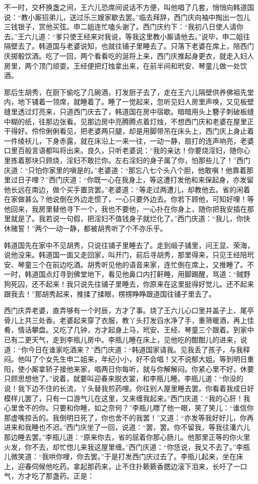 不一时，交杯换盏之间，王六儿恐席间说话不方便，叫他唱了几套，悄悄向韩道国说：“教小厮招弟儿，送过乐三嫂家歇去罢。”临去拜辞，西门庆向袖中掏出一包儿三钱银子，赏他买弦。申二姐连忙嗑头谢了。西门庆约下：“我初八日使人请你去。”王六儿道：“爹只使王经来对我说，等我这里教小厮请他去。”说毕，申二姐往隔壁去了。韩道国与老婆说知，也就往铺子里睡去了。只落下老婆在席上，陪西门庆掷骰饮酒。吃了一回，两个看看吃的涎将上来，西门庆推起身更衣，就走入妇人房里，两个顶门顽耍。王经便把灯烛拿出来，在前半间和玳安、琴童儿做一处饮酒。

那后生胡秀，在厨下偷吃了几碗酒，打发厨子去了，走在王六儿隔壁供养佛祖先堂内，地下铺着一领席，就睡着了。睡了一觉起来，忽听见妇人房里声唤，又见板壁缝里透过灯亮来，只道西门庆去了，韩道国在房中宿歇。暗暗用头上簪子刺破板缝中糊的纸，往那边张看。见那边房中亮腾腾点着灯烛，不想西门庆和老婆在屋里正干得好。伶伶俐俐看见，把老婆两只腿，却是用脚带吊在床头上，西门庆上身止着一件绫袄儿，下身赤露，就在床沿上一来一往，一动一静，扇打的连声响亮，老婆口里百般言语都叫将出来。良久，只听老婆说：“我的亲达！你要烧淫妇，随你心里拣着那块只顾烧，淫妇不敢拦你。左右淫妇的身子属了你，怕那些儿了！”西门庆道：“只怕你家里的嗔是的。”老婆道：“那忘八七个头八个胆，他敢嗔！他靠着那里过日子哩？”西门庆道：“你既一心在我身上，等这遭打发他和来保起身，亦发留他长远在南边，做个买手置货罢。”老婆道：“等走过两遭儿，却教他去。省的闲着在家做甚么？他说倒在外边走惯了，一心只要外边去。你若下顾他，可知好哩！等他回来，我房里替他寻下一个，我也不要他，一心扑在你身上，随你把我安插在那里就是了。我若说一句假，把淫妇不值钱身子就烂化了。”西门庆道：“我儿，你快休赌誓！”两个一动一静，都被胡秀听了个不亦乐乎。

韩道国先在家中不见胡秀，只说往铺子里睡去了。走到缎子铺里，问王显、荣海，说他没来。韩道国一面又走回家，叫开门，前后寻胡秀，那里得来，只见王经陪玳安、琴童三个在前边吃酒。胡秀听见他的语音来家，连忙倒在席上，又推睡了。不一时，韩道国点灯寻到佛堂地下，看见他鼻口内打鼾睡，用脚踢醒，骂道：“贼野狗死囚，还不起来！我只说先往铺子里睡去，你原来在这里挺得好觉儿。还不起来跟我去！”那胡秀起来，推揉了揉眼，楞楞睁睁跟道国往铺子里去了。

西门庆弄老婆，直弄够有一个时辰，方才了事。烧了王六儿心口里并\textMaoBi 盖子上、尾亭骨儿上共三处香。老婆起来穿了衣服，教丫头打发舀水净了手，重筛暖酒，再上佳肴，情话攀盘。又吃了几钟，方才起身上马，玳安、王经、琴童三个跟着。到家中已有二更天气，走到李瓶儿房中。李瓶儿睡在床上，见他吃的酣酣儿的进来，说道：“你今日在谁家吃酒来？”西门庆道：“韩道国家请我。见我丢了孩子，与我释闷。他叫了个女先生申二姐来，年纪小小，好不会唱！又不说郁大姐。等到明日重阳，使小厮拿轿子接他来家，唱两日你每听，就与你解解闷。你紧心里不好，休要只顾思想他了。”说着，就要叫迎春来脱衣裳，和李瓶儿睡。李瓶儿道：“你没的说！我下边不住的长流，丫头替我煎药哩。你往别人屋里睡去罢。你看着我成日好模样儿罢了，只有一口游气儿在这里，又来缠我起来。”西门庆道：“我的心肝！我心里舍不的你。只要和你睡，如之奈何？”李瓶儿瞟了他一眼，笑了笑儿：“谁信你那虚嘴掠舌的。我倒明日死了，你也舍不的我罢！”又道：“亦发等我好好儿，你再进来和我睡也不迟。”西门庆坐了一回，说道：“罢，罢。你不留我，等我往潘六儿那边睡去罢。”李瓶儿道：“原来你去，省的屈着你那心肠儿。他那里正等的你火里火发，你不去，却忙惚儿来我这屋里缠。”西门庆道：“你恁说，我又不去了。”李瓶儿微笑道：“我哄你哩，你去罢。”于是打发西门庆过去了。李瓶儿起来，坐在床上，迎春伺候他吃药。拿起那药来，止不住扑簌簌香腮边滚下泪来，长吁了一口气，方才吃了那盏药。正是：

